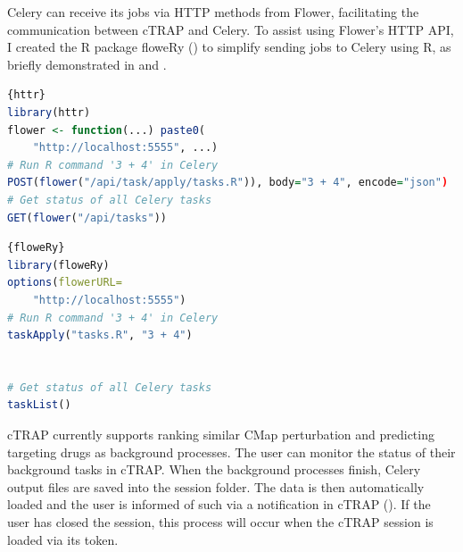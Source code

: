 Celery can receive its jobs via HTTP methods from Flower, facilitating the communication between cTRAP and Celery. To assist using Flower's HTTP API, I created the R package floweRy () to simplify sending jobs to Celery using R, as briefly demonstrated in  and .

\noindent\begin{minipage}{.48\textwidth}
\begin{lstlisting}[caption=Using plain \texttt{httr}.,language=R,label={lst:httr}]{httr}
library(httr)
flower <- function(...) paste0(
    "http://localhost:5555", ...)
# Run R command '3 + 4' in Celery
POST(flower("/api/task/apply/tasks.R")), body="3 + 4", encode="json")
# Get status of all Celery tasks
GET(flower("/api/tasks"))
\end{lstlisting}
\end{minipage}\hfill
\begin{minipage}{.48\textwidth}
\begin{lstlisting}[caption=Using \texttt{floweRy}.,language=R,label={lst:floweRy}]{floweRy}
library(floweRy)
options(flowerURL=
    "http://localhost:5555")
# Run R command '3 + 4' in Celery
taskApply("tasks.R", "3 + 4")


# Get status of all Celery tasks
taskList()
\end{lstlisting}
\end{minipage}

cTRAP currently supports ranking similar CMap perturbation and predicting targeting drugs as background processes. The user can monitor the status of their background tasks in cTRAP. When the background processes finish, Celery output files are saved into the session folder. The data is then automatically loaded and the user is informed of such via a notification in cTRAP (). If the user has closed the session, this process will occur when the cTRAP session is loaded via its token.

